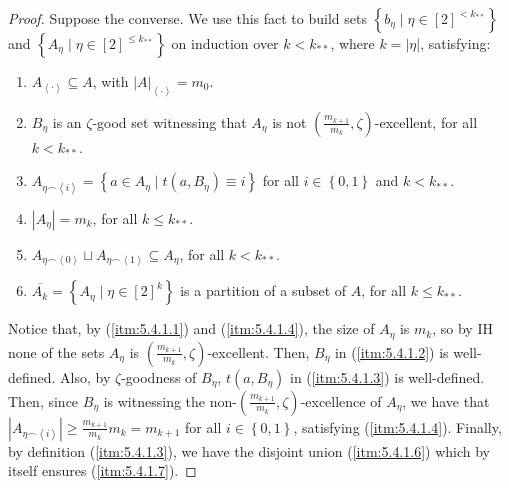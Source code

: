         \begin{proof}
            Suppose the converse.
            We use this fact to build sets $\left\{ b_\eta \mid \eta \in [2]^{<k_{**}} \right\}$ and
            $\left\{ A_\eta \mid \eta \in [2]^{\leq k_{**}} \right\}$ on induction over $k<k_{**}$, where $k = |\eta|$,
            satisfying:
            \begin{enumerate}
                \item\label{itm:5.4.1.1} $A_{\left< \cdot \right>} \subseteq A$, with $|A|_{\left< \cdot \right>} = m_0$.
                \item\label{itm:5.4.1.2} $B_\eta$ is an $\zeta$-good set witnessing that $A_\eta$ is not
                    $\left(\frac{m_{k+1}}{m_{k}}, \zeta\right)$-excellent, for all $k < k_{**}$.
                \item\label{itm:5.4.1.3} $A_{\eta \frown \left< i \right>} = \left\{ a \in A_\eta \mid t(a, B_\eta) \equiv i \right\}$
                    for all $i \in \left\{ 0,1 \right\}$ and $k < k_{**}$.
                \item\label{itm:5.4.1.4} $|A_{\eta}| = m_k$, for all $k \leq k_{**}$.
                \item\label{itm:5.4.1.6} $A_{\eta \frown \left< 0 \right>} \sqcup A_{\eta \frown \left< 1 \right>} \subseteq A_\eta$,
                    for all $k < k_{**}$.
                \item\label{itm:5.4.1.7} $\overline{A_k} = \left\{ A_\eta \mid \eta \in [2]^k \right\}$ is a partition of
                    a subset of $A$, for all $k \leq k_{**}$.
            \end{enumerate}
            Notice that, by (\ref{itm:5.4.1.1}) and (\ref{itm:5.4.1.4}), the size of $A_\eta$ is $m_k$,
            so by IH none of the sets $A_\eta$ is $\left(\frac{m_{k+1}}{m_{k}}, \zeta\right)$-excellent.
            Then, $B_\eta$ in (\ref{itm:5.4.1.2}) is well-defined.
            Also, by $\zeta$-goodness of $B_\eta$, $t(a, B_\eta)$ in (\ref{itm:5.4.1.3}) is well-defined.
            Then, since $B_\eta$ is witnessing the non-$\left(\frac{m_{k+1}}{m_{k}}, \zeta\right)$-excellence of $A_\eta$,
            we have that $|A_{\eta \frown \left< i \right>}| \geq \frac{m_{k+1}}{m_k} m_{k} = m_{k+1}$ for all
            $i \in \left\{ 0,1 \right\}$, satisfying (\ref{itm:5.4.1.4}).
            Finally, by definition (\ref{itm:5.4.1.3}), we have the disjoint union (\ref{itm:5.4.1.6}) which by itself
            ensures (\ref{itm:5.4.1.7}).


\end{proof}
